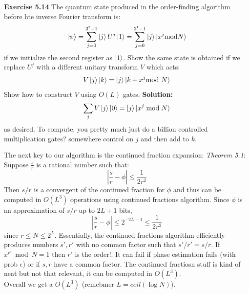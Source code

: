 \documentclass{article}
\begin{document}
\begin{tcolorbox}\textbf{Exercise 5.14} The quantum state produced in the order-finding algorithm before hte inverse Fourier transform is:
	$$\ket{\psi} = \sum_{j=0}^{2^t-1} \ket{j} U^j \ket{1} = \sum_{j=0}^{2^t-1} \ket{j} \ket{x^j \text{mod} N}$$
	if we initialize the second register as $\ket{1}$. Show the same state is obtained if we replace $U^j$ with a different unitary transform $V$ which acts:
	$$ V\ket{j}\ket{k} = \ket{j} \ket{k+x^j \text{mod }N}$$
	Show how to construct $V$ using $O(L)$ gates.
	\textbf{Solution:}\\
	$$\sum_{j} V\ket{j}\ket{0} = \ket{j}\ket{x^j \bmod N}$$ 
	as desired.
	To compute, you pretty much just do a billion controlled multiplication gates? somewhere control on $j$ and then add to $k$.
\end{tcolorbox}
The next key to our algorithm is the continued fraction expansion:
\textit{Theorem 5.1}: Suppose $\frac{s}{r}$ is a rational number such that:
$$|\frac{s}{r} - \phi| \leq \frac{1}{2r^2}$$
Then $s/r$ is a convergent of the continued fraction for $\phi$ and thus can be computed in $O(L^3)$ operations using continued fractions algorithm.
Since $\phi$ is an approximation of $s/r$ up to $2L+1$ bits, 
$$|\frac{s}{r}-\phi| \leq 2^{-2L-1} \leq \frac{1}{2r^2}$$ since $r \leq N \leq 2^L$. Essentially, the continued fractions algorithm efficiently produces numbers $s', r'$ with no common factor such that $s'/r' = s/r$.  If $x^{r'} \bmod N = 1$ then $r'$ is the order!. It can fail if phase estimation fails (with prob $\epsilon$) or if $s,r$ have a common factor. The continued fractiosn stuff is kind of neat but not that relevant, it can be computed in $O(L^3)$.\\
Overall we get a $O(L^3)$  (remebmer $L = ceil(\log N)$).
\end{document}
